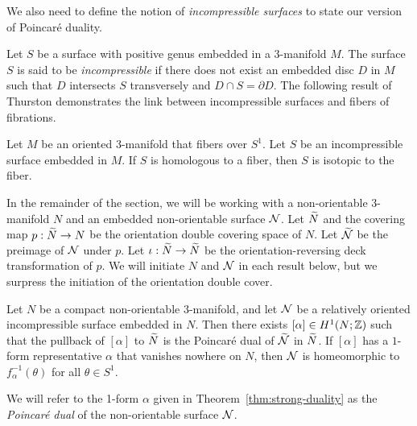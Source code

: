 We also need to define the notion of \emph{incompressible surfaces} to state our version of Poincar\'e duality.

  Let $S$ be a surface with positive genus embedded in a $3$-manifold $M$.
  The surface $S$ is said to be \emph{incompressible} if there does not exist an embedded disc $D$ in $M$ such that $D$ intersects $S$ transversely and $D \cap S = \partial D$.
  The following result of Thurston demonstrates the link between incompressible surfaces and fibers of fibrations.

\begin{thm}
  \label{thm:Thur2}
Let $M$ be an oriented 3-manifold that fibers over $S^1$.  Let $S$ be an incompressible surface embedded in $M$.  If $S$ is homologous to a fiber, then $S$ is isotopic to the fiber.
\end{thm}



In the remainder of the section, we will be working with a non-orientable 3-manifold $N$ and an embedded non-orientable surface $\mathcal{N}$.   Let $\widetilde{N}$ and the covering map $p:\widetilde{N}\rightarrow N$ be the orientation double covering space of $N$.  Let $\widetilde{\mathcal{N}}$ be the preimage of $\mathcal{N}$ under $p$.  Let $\iota:\widetilde{N}\rightarrow\widetilde{N}$ be the orientation-reversing deck transformation of $p$.  We will initiate $N$ and $\mathcal{N}$ in each result below, but we surpress the initiation of the orientation double cover.

\begin{thm}
  \label{thm:strong-duality}
  Let $N$ be a compact non-orientable $3$-manifold, and let $\mathcal{N}$ be a relatively oriented incompressible surface embedded in $N$.
  Then there exists $[\alpha] \in H^1(N; \mathbb{Z})$ such that the pullback of $[\alpha]$ to $\widetilde{N}$ is the Poincar\'e dual of $\widetilde{\mathcal{N}}$ in $\widetilde{N}$.
  If $[\alpha]$ has a $1$-form representative $\alpha$ that vanishes nowhere on $N$, then $\mathcal{N}$ is homeomorphic to $f_{\alpha}^{-1}(\theta)$ for all $\theta \in S^1$.
\end{thm}

We will refer to the 1-form $\alpha$ given in Theorem~\ref{thm:strong-duality} as the {\it Poincar\'e dual} of the non-orientable surface $\mathcal{N}$.

